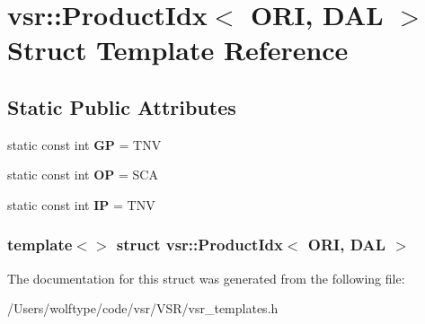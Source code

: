 \hypertarget{structvsr_1_1_product_idx_3_01_o_r_i_00_01_d_a_l_01_4}{\section{vsr\-:\-:Product\-Idx$<$ O\-R\-I, D\-A\-L $>$ Struct Template Reference}
\label{structvsr_1_1_product_idx_3_01_o_r_i_00_01_d_a_l_01_4}
}
\subsection*{Static Public Attributes}
\begin{DoxyCompactItemize}
\item 
\hypertarget{structvsr_1_1_product_idx_3_01_o_r_i_00_01_d_a_l_01_4_ac42fa82d0cef267849c24aa009f75ecf}{static const int {\bfseries G\-P} = T\-N\-V}\label{structvsr_1_1_product_idx_3_01_o_r_i_00_01_d_a_l_01_4_ac42fa82d0cef267849c24aa009f75ecf}

\item 
\hypertarget{structvsr_1_1_product_idx_3_01_o_r_i_00_01_d_a_l_01_4_a5175d77a0246c4862ce762b1f4435091}{static const int {\bfseries O\-P} = S\-C\-A}\label{structvsr_1_1_product_idx_3_01_o_r_i_00_01_d_a_l_01_4_a5175d77a0246c4862ce762b1f4435091}

\item 
\hypertarget{structvsr_1_1_product_idx_3_01_o_r_i_00_01_d_a_l_01_4_a35588751dfcda333fe841a3fd5ac1552}{static const int {\bfseries I\-P} = T\-N\-V}\label{structvsr_1_1_product_idx_3_01_o_r_i_00_01_d_a_l_01_4_a35588751dfcda333fe841a3fd5ac1552}

\end{DoxyCompactItemize}
\subsubsection*{template$<$$>$ struct vsr\-::\-Product\-Idx$<$ O\-R\-I, D\-A\-L $>$}



The documentation for this struct was generated from the following file\-:\begin{DoxyCompactItemize}
\item 
/\-Users/wolftype/code/vsr/\-V\-S\-R/vsr\-\_\-templates.\-h\end{DoxyCompactItemize}
